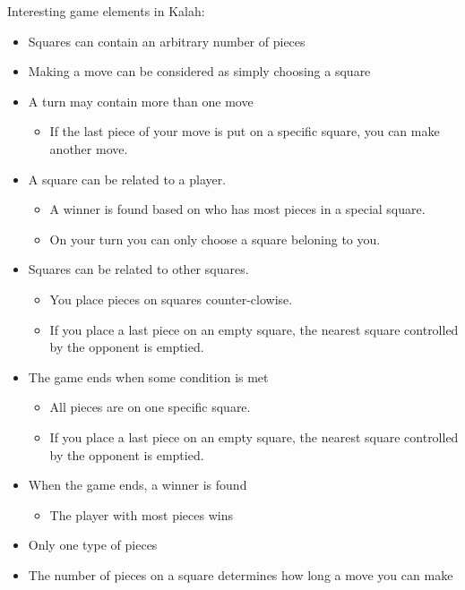 Interesting game elements in Kalah:
\begin{itemize}[noitemsep]
\item Squares can contain an arbitrary number of pieces
\item Making a move can be considered as simply choosing a square
\item A turn may contain more than one move
	\begin{itemize}[noitemsep]
	\item If the last piece of your move is put on a specific square, you can make another move.
	\end{itemize}
\item A square can be related to a player.
	\begin{itemize}[noitemsep]
	\item A winner is found based on who has most pieces in a special square.
	\item On your turn you can only choose a square beloning to you.
	\end{itemize}
\item Squares can be related to other squares.
	\begin{itemize}[noitemsep]
	\item You place pieces on squares counter-clowise.
	\item If you place a last piece on an empty square, the nearest square controlled by the opponent is emptied.
	\end{itemize}
\item The game ends when some condition is met
	\begin{itemize}[noitemsep]
	\item All pieces are on one specific square.
	\item If you place a last piece on an empty square, the nearest square controlled by the opponent is emptied.
	\end{itemize}
\item When the game ends, a winner is found
	\begin{itemize}[noitemsep]
	\item The player with most pieces wins
	\end{itemize}
\item Only one type of pieces
\item The number of pieces on a square determines how long a move you can make
\end{itemize}

